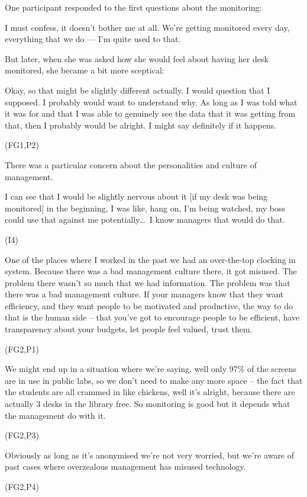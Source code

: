 One participant responded to the first questions about the monitoring:
 \begin{qt}I must confess, it doesn’t bother me at all. We’re getting monitored
every day, everything that we do --– I’m quite used to that.\end{qt}
But later,
when she was asked how she would feel about having her desk monitored,
she became a bit more sceptical: \begin{qt}Okay, so that might be slightly
different actually. I would question that I supposed. I probably would
want to understand why. As long as I was told what it was for and that
I was able to genuinely see the data that it was getting from that,
then I probably would be alright. I might say definitely if it
happens.\end{qt} (FG1,P2)

There was a particular concern about the personalities and culture of management.

\begin{qt}I can see that I would be slightly nervous about it [if my desk was
being monitored] in the beginning, I was like, hang on, I’m being
watched, my boss could use that against me potentially\ldots\  I know managers
that would do that.\end{qt} (I4)

\begin{qt}One of the places where I worked in the past we had an
  over-the-top clocking in system. Because there was a bad management
  culture there, it got misused. The problem there wasn’t so much that
  we had information. The problem was that there was a bad management
  culture. If your managers know that they want efficiency, and they
  want people to be motivated and productive, the way to do that is
  the human side – that you’ve got to encourage people to be
  efficient, have transparency about your budgets, let people feel
  valued, trust them.\end{qt} (FG2,P1) 

\begin{qt}We might end up in a situation where we’re saying, well only
  97\% of the screens are in use in public labs, so we don’t need to
  make any more space – the fact that the students are all crammed in
  like chickens, well it’s alright, because there are actually 3 desks
  in the library free. So monitoring is good but it depends what the
  management do with it.\end{qt} (FG2,P3) 
 
\begin{qt}Obviously as long as it’s anonymised we’re not very worried,
  but we’re aware of past cases where overzealous management has
  misused technology.\end{qt} (FG2,P4) 

